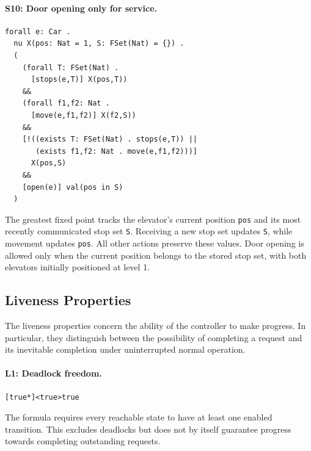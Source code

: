 \paragraph{S10: Door opening only for service.}
\noindent \begin{lstlisting}
forall e: Car .
  nu X(pos: Nat = 1, S: FSet(Nat) = {}) .
  (
    (forall T: FSet(Nat) .
      [stops(e,T)] X(pos,T))
    &&
    (forall f1,f2: Nat .
      [move(e,f1,f2)] X(f2,S))
    &&
    [!((exists T: FSet(Nat) . stops(e,T)) ||
       (exists f1,f2: Nat . move(e,f1,f2)))]
      X(pos,S)
    &&
    [open(e)] val(pos in S)
  )
\end{lstlisting}

The greatest fixed point tracks the elevator's current position \texttt{pos} and its most recently communicated stop set \texttt{S}. Receiving a new stop set updates \texttt{S}, while movement updates \texttt{pos}. All other actions preserve these values. Door opening is allowed only when the current position belongs to the stored stop set, with both elevators initially positioned at level 1.

\subsection{Liveness Properties}
\label{subsec:liveness-properties}

The liveness properties concern the ability of the controller to make progress. In particular, they distinguish between the possibility of completing a request and its inevitable completion under uninterrupted normal operation.

\paragraph{L1: Deadlock freedom.}
\noindent \begin{lstlisting}
[true*]<true>true
\end{lstlisting}
The formula requires every reachable state to have at least one enabled transition. This excludes deadlocks but does not by itself guarantee progress towards completing outstanding requests.

\newpage

